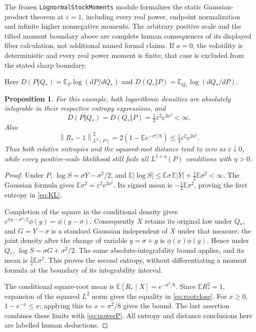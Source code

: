 \documentclass[11pt]{article}
\newtheorem{proposition}[theorem]{Proposition}
\theoremstyle{remark}\newtheorem{remark}[theorem]{Remark}
\newcommand{\E}{\mathbb E}
\newcommand{\norm}[1]{\left\lVert#1\right\rVert}
\begin{document}
The frozen \texttt{LognormalStockMoments} module formalizes the
static Gaussian-product theorem at $\varepsilon=1$, including every
real power, endpoint normalization and infinite higher nonnegative
moments. The arbitrary positive scale and the tilted moment boundary
above are complete human consequences of its displayed fiber
calculation, not additional named formal claims. If $a=0$, the
volatility is deterministic and every real power moment is finite;
that case is excluded from the stated sharp boundary.

Here $D(P\Vert Q_*)=\E_P\log(dP/dQ_*)$ and
$D(Q_*\Vert P)=\E_{Q_*}\log(dQ_*/dP)$.

\begin{proposition}\label{prop:finiteKL}
For this example, both logarithmic densities are absolutely
integrable in their respective entropy expressions, and
\begin{equation}\label{eq:KL}
 D(P\Vert Q_*)=D(Q_*\Vert P)
       =\tfrac12\varepsilon^2e^{2a^2}<\infty.
\end{equation}
Also
\begin{equation}\label{eq:rootclose}
 \norm{R_*-1}_{L^2(P)}^2
 =2\left(1-\E e^{-\sigma^2/8}\right)
 \le\tfrac14\varepsilon^2e^{2a^2}.
\end{equation}
Thus both relative entropies and the squared-root distance tend to
zero as $\varepsilon\downarrow0$, while every positive-scale
likelihood still fails all $L^{1+\eta}(P)$ conditions with $\eta>0$.
\end{proposition}
\begin{proof}
Under $P$, $\log S=\sigma Y-\sigma^2/2$, and
$\E|\log S|\le\E\sigma\,\E|Y|+\frac12\E\sigma^2<\infty$.
The Gaussian formula gives $\E\sigma^2=\varepsilon^2e^{2a^2}$.
Its signed mean is $-\frac12\E\sigma^2$, proving the first entropy
in \eqref{eq:KL}.

Completion of the square in the conditional density gives
$e^{\sigma y-\sigma^2/2}\phi(y)=\phi(y-\sigma)$.
Consequently $X$ retains its original law under $Q_*$, and
$G=Y-\sigma$ is a standard Gaussian independent of $X$ under that
measure: the joint density after the change of variable $y=\sigma+g$
is $\phi(x)\phi(g)$. Hence under $Q_*$,
$\log S=\sigma G+\sigma^2/2$. The same absolute-integrability
bound applies, and its mean is $\frac12\E\sigma^2$.
This proves the second entropy, without differentiating a moment
formula at the boundary of its integrability interval.

The conditional square-root mean is
$\E[R_*\mid X]=e^{-\sigma^2/8}$. Since $\E R_*^2=1$, expansion of
the squared $L^2$ norm gives the equality in \eqref{eq:rootclose}.
For $x\ge0$, $1-e^{-x}\le x$; applying this to $x=\sigma^2/8$
gives the bound. The last assertion combines these limits with
\eqref{eq:powerP}. All entropy and distance conclusions here are
labelled human deductions.
\end{proof}
\end{document}

